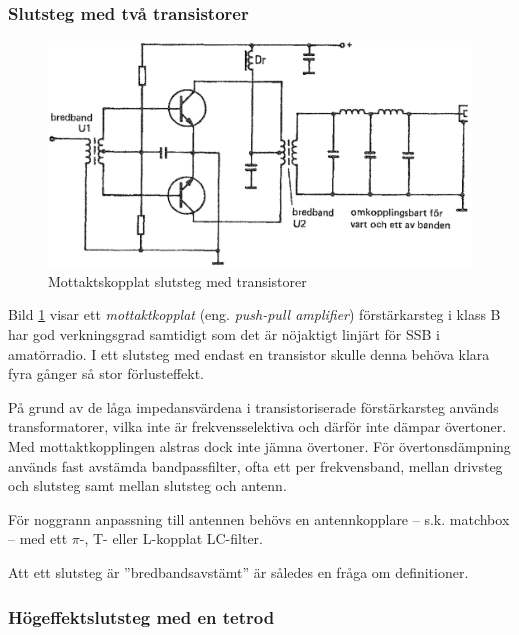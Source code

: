 \subsubsection{Slutsteg med två transistorer}

\begin{figure}
\includegraphics[width=\textwidth]{images/cropped_pdfs/bild_2_3-49.pdf}
\caption{Mottaktskopplat slutsteg med transistorer}
\label{fig:BildII3-49}
\end{figure}

Bild \ref{fig:BildII3-49} visar ett \emph{mottaktkopplat} (eng.
\emph{push-pull amplifier}) förstärkarsteg i klass B har god verkningsgrad
samtidigt som det är nöjaktigt linjärt för SSB i amatörradio.
I ett slutsteg med endast en transistor skulle denna behöva klara fyra gånger
så stor förlusteffekt.

På grund av de låga impedansvärdena i transistoriserade förstärkarsteg används
transformatorer, vilka inte är frekvensselektiva och därför inte dämpar
övertoner.
Med mottaktkopplingen alstras dock inte jämna övertoner.
För övertonsdämpning används fast avstämda bandpassfilter, ofta ett per
frekvensband, mellan drivsteg och slutsteg samt mellan slutsteg och antenn.

För noggrann anpassning till antennen behövs en antennkopplare --
s.k. matchbox -- med ett \(\pi \)-, T- eller L-kopplat LC-filter.

Att ett slutsteg är ''bredbandsavstämt'' är således en fråga om definitioner.

\subsubsection{Högeffektslutsteg med en tetrod}

